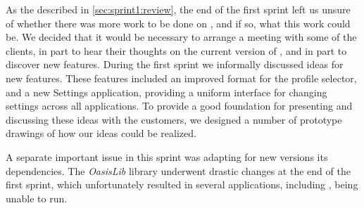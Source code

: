 As the described in \cref{sec:sprint1:review}, the end of the first sprint left us unsure of whether there was more work to be done on \launcher, and if so, what this work could be. 
We decided that it would be necessary to arrange a meeting with some of the clients, in part to hear their thoughts on the current version of \launcher, and in part to discover new features.
During the first sprint we informally discussed ideas for new features.
These features included an improved format for the profile selector, and a new Settings application, providing a uniform interface for changing settings across all applications. 
To provide a good foundation for presenting and discussing these ideas with the customers, we designed a number of prototype drawings of how our ideas could be realized.

A separate important issue in this sprint was adapting \launcher for new versions its dependencies. The \textit{OasisLib} library underwent drastic changes at the end of the first sprint, which unfortunately resulted in several applications, including \launcher, being unable to run.
